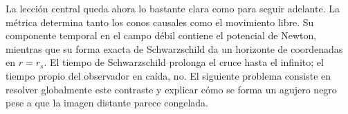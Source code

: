 La lección central queda ahora lo bastante clara como para seguir adelante. La métrica determina tanto los conos causales como el movimiento libre. Su componente temporal en el campo débil contiene el potencial de Newton, mientras que su forma exacta de Schwarzschild da un horizonte de coordenadas en \(r=r_s\). El tiempo de Schwarzschild prolonga el cruce hasta el infinito; el tiempo propio del observador en caída, no. El siguiente problema consiste en resolver globalmente este contraste y explicar cómo se forma un agujero negro pese a que la imagen distante parece congelada.